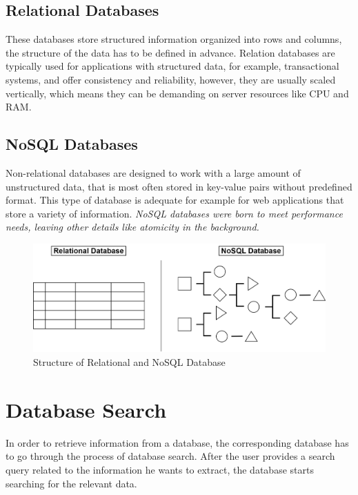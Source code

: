 \documentclass[12pt, a4paper]{article}
\begin{document}
    \subsection{Relational Databases}
        These databases store structured information organized into rows and columns, the structure of the data has to be defined in advance. Relation databases are typically used for applications with structured data, for example, transactional systems, and offer consistency and reliability, however, they are usually scaled vertically, which means they can be demanding on server resources like CPU and RAM.

    \subsection{NoSQL Databases}
        Non-relational databases are designed to work with a large amount of unstructured data, that is most often stored in key-value pairs without predefined format. This type of database is adequate for example for web applications that store a variety of information. \textit{NoSQL databases were born to meet performance needs, leaving other details like atomicity in the background.}\cite{06}\\
        \begin{figure}[h]
            \centering
            \includegraphics[width=1\linewidth]{images/relational-nosql.png}
            \caption{Structure of Relational and NoSQL Database}
            \label{fig:structure}
        \end{figure}
\clearpage

\section{Database Search}
    In order to retrieve information from a database, the corresponding database has to go through the process of database search. After the user provides a search query related to the information he wants to extract, the database starts searching for the relevant data. 
    
\end{document}
